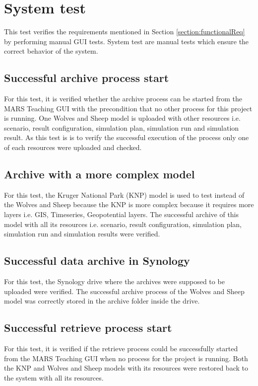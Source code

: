 \section{System test}
This test verifies the requirements mentioned in Section \ref{section:functionalReq} by performing manual GUI tests. System test are manual tests
which ensure the correct behavior of the system.

\subsection{Successful archive process start}
For this test, it is verified whether the archive process can be started from the MARS Teaching GUI with the precondition that no other process
for this project is running. One Wolves and Sheep model is uploaded with other resources i.e. scenario, result configuration,
simulation plan, simulation run and simulation result. As this test is is to verify the successful execution of the process only one of each resources
were uploaded and checked.

\subsection{Archive with a more complex model}
For this test, the Kruger National Park (KNP) model is used to test instead of the Wolves and Sheep because the KNP is more complex because it requires more layers
i.e. GIS, Timeseries, Geopotential layers. The successful archive of this model with all its resources i.e. scenario, result configuration, simulation plan, simulation run
and simulation results were verified. 

\subsection{Successful data archive in Synology}
For this test, the Synology drive where the archives were supposed to be uploaded were verified. The successful archive process of the Wolves and Sheep model
was correctly stored in the archive folder inside the drive.

\subsection{Successful retrieve process start}
For this test, it is verified if the retrieve process could be successfully started from the MARS Teaching GUI when no process for the project is running.
Both the KNP and Wolves and Sheep models with its resources were restored back to the system with all its resources. 

